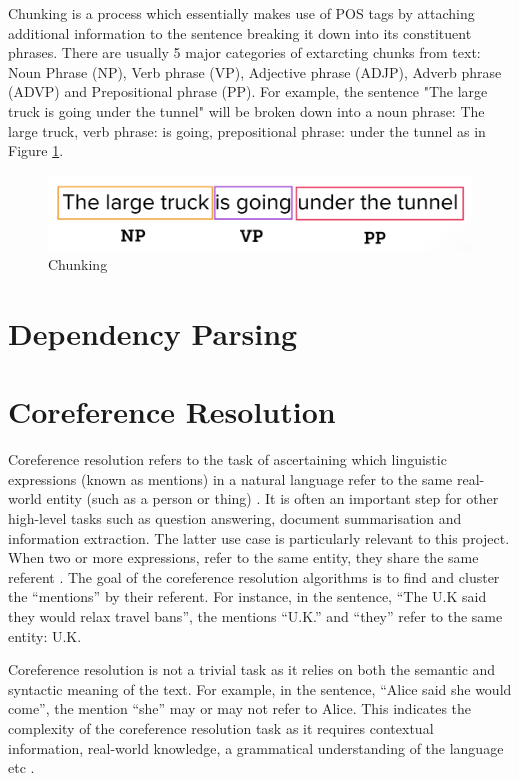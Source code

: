 Chunking is a process which essentially makes use of POS tags by attaching additional information to the sentence breaking it down into its constituent phrases. There are usually 5 major categories of extarcting chunks from text: Noun Phrase (NP), Verb phrase (VP), Adjective phrase (ADJP), Adverb phrase (ADVP) and Prepositional phrase (PP). 
For example, the sentence "The large truck is going under the tunnel" will be broken down into a noun phrase: The large truck, verb phrase: is going, prepositional phrase: under the tunnel as in Figure \ref{fig:chunking}.

\begin{figure}[H]
\centering
\includegraphics[scale=0.35]{images/chunking.png}
\caption{Chunking}
\label{fig:chunking}
\end{figure}



\section{Dependency Parsing} \label{dependency_grammar}


\section{Coreference Resolution}

Coreference resolution refers to the task of ascertaining which linguistic expressions (known as mentions) in a natural language refer to the same real-world entity (such as a person or thing) \cite{zheng2011coreference}. It is often an important step for other high-level tasks such as question answering, document summarisation and information extraction. The latter use case is particularly relevant to this project. When two or more expressions, refer to the same entity, they share the same referent \cite{wiki_coref}. The goal of the coreference resolution algorithms is to find and cluster the “mentions” by their referent. For instance, in the sentence, “The U.K said they would relax travel bans”, the mentions “U.K.” and “they” refer to the same entity: U.K. 

Coreference resolution is not a trivial task as it relies on both the semantic and syntactic meaning of the text. For example, in the sentence, “Alice said she would come”, the mention “she” may or may not refer to Alice.  This indicates the complexity of the coreference resolution task as it requires contextual information, real-world knowledge, a grammatical understanding of the language etc \cite{zheng2011coreference}.


